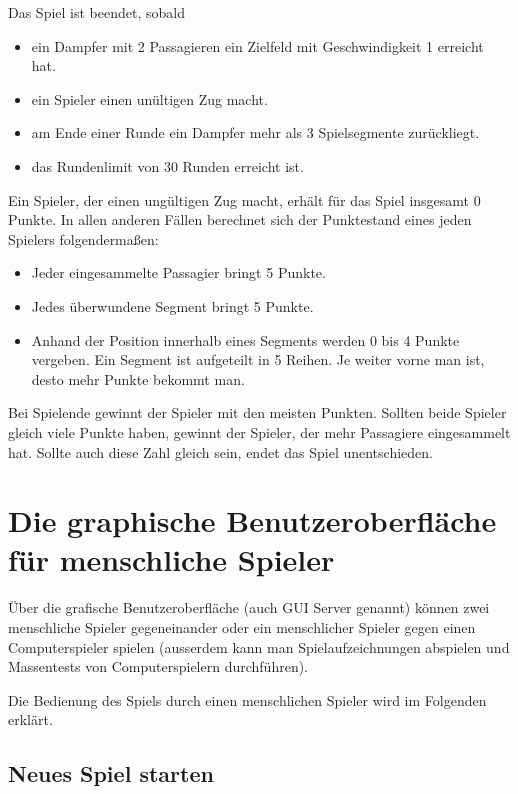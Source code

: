 \documentclass[12pt,a4paper, ngerman, oneside]{scrartcl}
\begin{document}
Das Spiel ist beendet, sobald

\begin{itemize}
\item ein Dampfer mit 2 Passagieren ein Zielfeld mit Geschwindigkeit 1 erreicht hat.
\item ein Spieler einen unültigen Zug macht.
\item am Ende einer Runde ein Dampfer mehr als 3 Spielsegmente zurückliegt.
  \item das Rundenlimit von 30 Runden erreicht ist.
\end{itemize}

Ein Spieler, der einen ungültigen Zug macht, erhält für das Spiel insgesamt 0
Punkte. In allen anderen Fällen berechnet sich der Punktestand eines jeden
Spielers folgendermaßen:

\begin{itemize}
  \item Jeder eingesammelte Passagier bringt 5 Punkte.
  \item Jedes überwundene Segment bringt 5 Punkte.
  \item Anhand der Position innerhalb eines Segments werden 0 bis 4 Punkte
    vergeben. Ein Segment ist aufgeteilt in 5 Reihen. Je weiter vorne man ist,
    desto mehr Punkte bekommt man.
\end{itemize}

Bei Spielende gewinnt der Spieler mit den meisten Punkten. Sollten beide Spieler
gleich viele Punkte haben, gewinnt der Spieler, der mehr Passagiere eingesammelt
hat. Sollte auch diese Zahl gleich sein, endet das Spiel unentschieden.

\section{Die graphische Benutzeroberfläche für menschliche Spieler}

Über die grafische Benutzeroberfläche (auch GUI Server genannt) können zwei
menschliche Spieler gegeneinander oder ein menschlicher Spieler gegen einen
Computerspieler spielen (ausserdem kann man Spielaufzeichnungen abspielen und
Massentests von Computerspielern durchführen).

Die Bedienung des Spiels durch einen menschlichen Spieler wird im Folgenden
erklärt.

\subsection{Neues Spiel starten}
\end{document}
